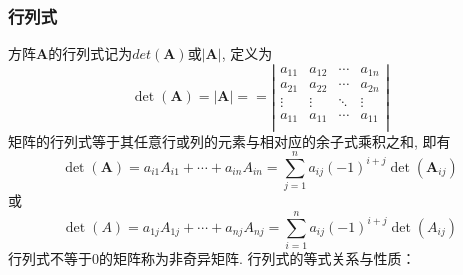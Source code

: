 \documentclass[lang=cn,10pt]{gorgeousnbook}
\numberwithin{equation}{section}%
\numberwithin{figure}{section}%
\begin{document}
\subsubsection{行列式}
方阵$\bm{A}$的行列式记为$det(\bm{A})$或$\left| \bm{A} \right|$, 定义为
\begin{equation}
\det(\boldsymbol{A})=|\boldsymbol{A}|==\left| \begin{matrix}
	a_{11}&		a_{12}&		\cdots&		a_{1n}\\
	a_{21}&		a_{22}&		\cdots&		a_{2n}\\
	\vdots&		\vdots&		\ddots&		\vdots\\
	a_{11}&		a_{11}&		\cdots&		a_{11}\\
\end{matrix} \right|
\end{equation}
矩阵的行列式等于其任意行或列的元素与相对应的余子式乘积之和, 即有
\begin{equation}
\det(\boldsymbol{A})=a_{i1}A_{i1}+\cdots+a_{in}A_{in}=\sum_{j=1}^na_{ij}(-1)^{i+j}\det(\boldsymbol{A}_{ij})
\end{equation}
或
\begin{equation}
\det(A)=a_{1j}A_{1j}+\cdots+a_{nj}A_{nj}=\sum_{i=1}^na_{ij}(-1)^{i+j}\det(A_{ij})
\end{equation}
行列式不等于0的矩阵称为非奇异矩阵. 
行列式的等式关系与性质：
\end{document}
